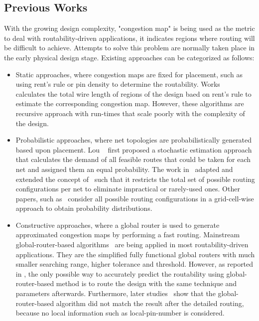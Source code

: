 \subsection{Previous Works}
With the growing design complexity, "congestion map" is being used as the metric to deal with routability-driven applications, it indicates regions where routing will be difficult to achieve. Attempts to solve this problem are normally taken place in the early physical design stage. Existing approaches can be categorized as follows:
\begin{itemize}
\item Static approaches, where congestion maps are fixed for placement, such as using rent's rule or pin density to determine the routability. Works~\cite{rentsrule,rentsrulerecursive} calculates the total wire length of regions of the design baed on rent's rule to estimate the corresponding congestion map. However, these algorithms are recursive approach with run-times that scale poorly with the complexity of the design. 
\item Probabilistic approaches, where net topologies are probabilistically generated based upon placement.  Lou \etal~\cite{first} first proposed a stochastic estimation approach that calculates the demand of all feasible routes that could be taken for each net and assigned them an equal probability. The work in~\cite{modeling} adapted and extended the concept of~\cite{first} such that it restricts the total set of possible routing configurations per net to eliminate impractical or rarely-used ones. Other papers, such as~\cite{SMD, 3step} consider all possible routing configurations in a grid-cell-wise approach to obtain probability distributions.
\item Constructive approaches, where a global router is used to generate approximated congestion maps by performing a fast routing.  Mainstream global-router-based algorithms~\cite{mixedsizeplacement,ripple,simplr,nctufast,fastroute} are being applied in most routability-driven applications. They are the simplified fully functional global routers with much smaller searching range, higher tolerance and threshold. However, as reported in \cite{fastroute}, the only possible way to accurately predict the routability using global-router-based method is to route the design with the same technique and parameters afterwards. Furthermore, later studies~\cite{study,ispd14,ispd15} show that the global-router-based algorithm did not match the result after the detailed routing, because no local information such as local-pin-number is considered.

\end{itemize}
